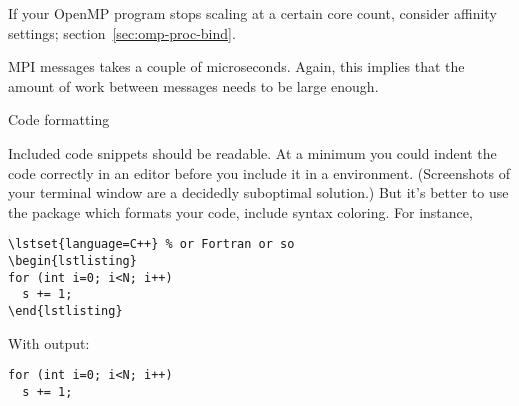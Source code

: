 If your OpenMP program stops scaling at a certain core count,
consider affinity settings; section~\ref{sec:omp-proc-bind}.

MPI messages takes a couple of microseconds. Again, this implies that the
amount of work between messages needs to be large enough.

 {Code formatting}

Included code snippets should be readable. At a minimum you could 
indent the code correctly in an editor before you include it in
a  environment. (Screenshots of your terminal
window are a decidedly suboptimal solution.)
But it's better to use the  package which formats
your code, include syntax coloring. For instance, 
\begin{verbatim}
\lstset{language=C++} % or Fortran or so
\begin{lstlisting}
for (int i=0; i<N; i++)
  s += 1;
\end{lstlisting}
\end{verbatim}

With output:
\lstset{language=C++} %
\begin{lstlisting}
for (int i=0; i<N; i++)
  s += 1;
\end{lstlisting}

\endinput

\Level 1 {Including code in your writeup}

If you include code samples in your writeup, make sure they look good. For starters,
use a mono-spaced font. In \LaTeX, you can use the \n{verbatim} environment or the 
\n{verbatiminput} command. In that section option the source is included automatically,
rather than cut and pasted. This is to be preferred, since your writeup will
stay current after you edit the source file.

Including whole source files makes for a long and boring writeup. The code samples in this
book were generated as follows. In the source files, the relevant snippet was marked as
\begin{verbatim}
... boring stuff
//snippet samplex
  .. interesting! ..
//snippet end
... more boring stuff
\end{verbatim}
The files were then processed with the following command line (actually, included
in a makefile, which requires doubling the dollar signs):
\begin{verbatim}
for f in *.{c,cxx,h} ; do
  cat $x | awk 'BEGIN {f=0}
                /snippet end/ {f=0}
                f==1 {print $0 > file}
                /snippet/ && !/end/ {f=1; file=$2 }
               '
done
\end{verbatim}
which gives (in this example) a file \n{samplex}. Other solutions are of course possible.

